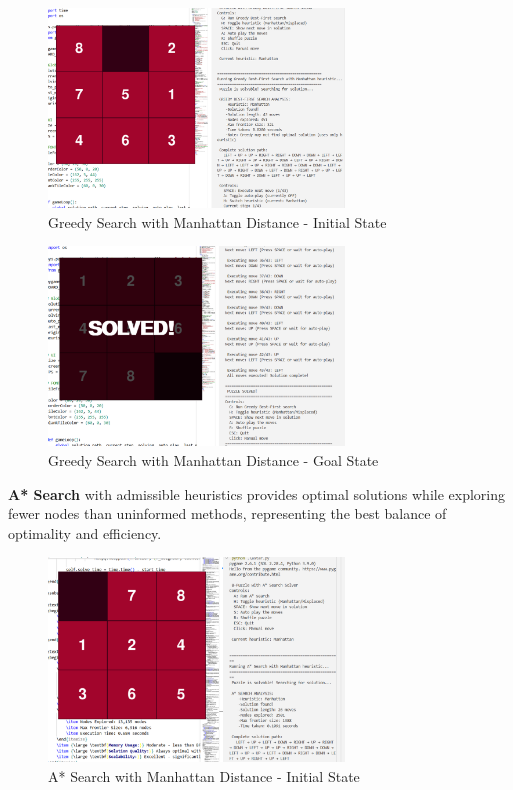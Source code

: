 \documentclass[11pt,a4paper]{article}
\begin{document}
\begin{figure}[H]
\centering
\includegraphics[width=0.7\textwidth]{../searches/greedy_8_puzzle/Start_state_man.png}
\caption{Greedy Search with Manhattan Distance - Initial State}
\end{figure}

\begin{figure}[H]
\centering
\includegraphics[width=0.7\textwidth]{../searches/greedy_8_puzzle/End_state_man.png}
\caption{Greedy Search with Manhattan Distance - Goal State}
\end{figure}

\textbf{A* Search} with admissible heuristics provides optimal solutions while exploring fewer nodes than uninformed methods, representing the best balance of optimality and efficiency.

\begin{figure}[H]
\centering
\includegraphics[width=0.7\textwidth]{../searches/astar_8_puzzle/Start_state_man.png}
\caption{A* Search with Manhattan Distance - Initial State}
\end{figure}
\end{document}

